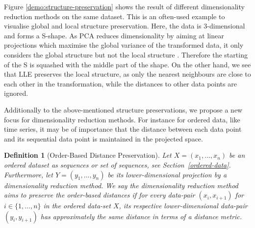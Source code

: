 \documentclass[pdftex,12pt,a4paper]{report}
\newtheorem{definition}{Definition}[section]
\begin{document}
Figure \ref{demo:structure-preservation} shows the result of different dimensionality reduction methods on the same dataset.
This is an often-used example to visualise global and local structure preservation.
Here, the data is 3-dimensional and forms a S-shape.
As PCA reduces dimensionality by aiming at linear projections which maximise the global variance of the transformed data, it only considers the global structure but not the local structure \cite{global-local-structure} \cite{PCA-global-structure-preserving}.
Therefore the starting of the S is squashed with the middle part of the shape.
On the other hand, we see that LLE preserves the local structure, as only the nearest neighbours are close to each other in the transformation, while the distances to other data points are ignored.

Additionally to the above-mentioned structure preservations, we propose a new focus for dimensionality reduction methods. 
For instance for ordered data, like time series, it may be of importance that the distance between each data point and its sequential data point is maintained in the projected space.

\begin{definition}[Order-Based Distance Preservation]
    Let $X = (x_1,\dots,x_n )$ be an ordered dataset as sequences or set of sequences, see Section~\ref{ordered-data}.
    Furthermore, let $Y = (y_1, \dots, y_n)$ be its lower-dimensional projection by a dimensionality reduction method.
    We say the dimensionality reduction method aims to preserve the order-based distances if for every data-pair $(x_i, x_{i+1})$ for $ i \in \{1, \dots, n \}$ in the ordered data-set $X$, its respective lower-dimensional data-pair $(y_i, y_{i+1})$ has approximately the same distance in terms of a distance metric.
\end{definition}
\end{document}
